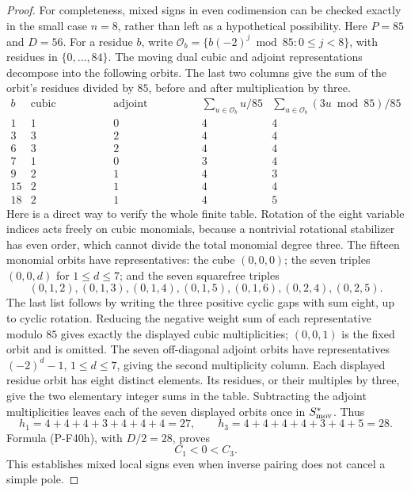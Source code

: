 \begin{proof}
For completeness, mixed signs in even codimension can be checked
exactly in the small case $n=8$, rather than left as a hypothetical
possibility. Here $P=85$ and $D=56$. For a residue $b$, write
$\mathcal O_b=\{b(-2)^j\bmod85:0\le j<8\}$, with residues in
$\{0,\ldots,84\}$. The moving dual cubic and adjoint representations
decompose into the following orbits. The last two columns give the
sum of the orbit's residues divided by $85$, before and after
multiplication by three.
\[
\begin{array}{c|rrrr}
 b&\text{cubic multiplicity}&\text{adjoint multiplicity}
       &\sum_{u\in\mathcal O_b}u/85
       &\sum_{u\in\mathcal O_b}(3u\bmod85)/85\\\hline
 1&1&0&4&4\\
 3&3&2&4&4\\
 6&3&2&4&4\\
 7&1&0&3&4\\
 9&2&1&4&3\\
15&2&1&4&4\\
18&2&1&4&5
\end{array}
\]
Here is a direct way to verify the whole finite table. Rotation
of the eight variable indices acts freely on cubic monomials,
because a nontrivial rotational stabilizer has even order,
which cannot divide the total monomial degree three.
The fifteen monomial orbits have representatives: the cube
$(0,0,0)$; the seven triples $(0,0,d)$ for $1\le d\le7$;
and the seven squarefree triples
\[
 (0,1,2),(0,1,3),(0,1,4),(0,1,5),(0,1,6),(0,2,4),(0,2,5).
\]
The last list follows by writing the three positive cyclic gaps
with sum eight, up to cyclic rotation. Reducing the negative
weight sum of each representative modulo $85$ gives exactly
the displayed cubic multiplicities; $(0,0,1)$ is the fixed
orbit and is omitted. The seven off-diagonal adjoint orbits
have representatives $(-2)^d-1$, $1\le d\le7$, giving the
second multiplicity column. Each displayed residue orbit has
eight distinct elements. Its residues, or their multiples by
three, give the two elementary integer sums in the table.
Subtracting the adjoint multiplicities leaves each of the seven
displayed orbits once in $S^*_{\rm mov}$. Thus
\[
 h_1=4+4+4+3+4+4+4=27,\qquad
 h_3=4+4+4+4+3+4+5=28.
\]
Formula (P-F40h), with $D/2=28$, proves
\[
                              C_1<0<C_3.
 \tag{P-F40k}
\]
This establishes mixed local signs even when inverse pairing
does not cancel a simple pole.
\end{proof}

